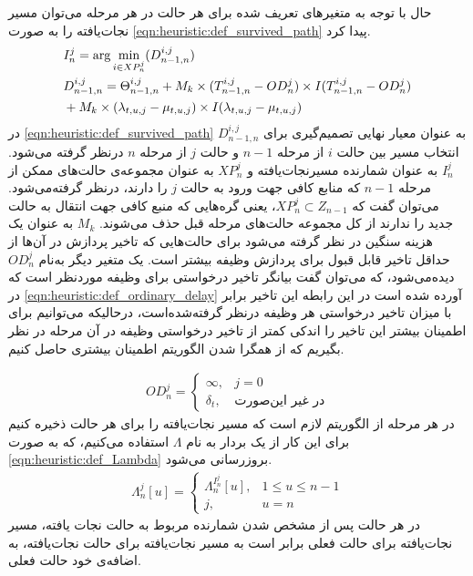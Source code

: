 	حال با توجه به متغیرهای تعریف شده برای هر حالت در هر مرحله می‌توان مسیر نجات‌یافته را به صورت \cref{eqn:heuristic:def_survived_path} پیدا کرد. 
	\begin{align}\label{eqn:heuristic:def_survived_path}
		&I_n^j = \arg \min_{i \in XP_n^j} (D_{n-1,n}^{i,j}) \\
		&D_{n-1,n}^{i,j} = \Theta_{n-1,n}^{i,j} + M_k \times (T_{n-1,n}^{i,j} - OD_n^j) \times I(T_{n-1,n}^{i,j} - OD_n^j) \notag \\
		&+M_k \times (\lambda_{t,u,j} - \mu_{t,u,j}) \times I(\lambda_{t,u,j} - \mu_{t,u,j})
	\end{align}	
در \cref{eqn:heuristic:def_survived_path} $D_{n-1,n}^{i,j}$ به عنوان معیار نهایی تصمیم‌گیری برای انتخاب مسیر بین حالت $i$ از مرحله $n-1$ و حالت $j$ از مرحله $n$ درنظر گرفته می‌شود. $I_n^j$ به عنوان شمارنده مسیرنجات‌یافته و $XP_n^j$ به عنوان مجموعه‌ی حالت‌های ممکن از مرحله $n-1$ که منابع کافی جهت ورود به حالت $j$ را دارند، درنظر گرفته‌می‌شود. می‌توان گفت که $XP_n^j \subset Z_{n-1}$، یعنی گره‌هایی که منبع کافی جهت انتقال به حالت جدید را ندارند از کل مجموعه حالت‌های مرحله قبل حذف می‌شوند. $M_k$ به عنوان یک هزینه سنگین در نظر گرفته می‌شود برای حالت‌هایی که تاخیر پردازش در آن‌ها از حداقل تاخیر قابل قبول برای پردازش وظیفه بیشتر است. یک متغیر دیگر به‌نام $OD_n^j$ دیده‌می‌شود، که می‌توان گفت بیانگر تاخیر درخواستی برای وظیفه موردنظر است که در \cref{eqn:heuristic:def_ordinary_delay} آورده شده است در این رابطه این تاخیر برابر با میزان تاخیر درخواستی هر وظیفه درنظر گرفته‌شده‌است، درحالیکه می‌توانیم برای اطمینان بیشتر این تاخیر را اندکی کمتر از تاخیر درخواستی وظیفه در آن مرحله در نظر بگیریم که از همگرا شدن الگوریتم اطمینان بیشتری حاصل کنیم. 

	\begin{align}\label{eqn:heuristic:def_ordinary_delay}
		OD_n^j = 
		\begin{cases}
			\infty, & \text{$j = 0$} \\
			\delta_t,& \text{در غیر این‌صورت}
		\end{cases}
	\end{align}
	در هر مرحله از الگوریتم لازم است که مسیر نجات‌یافته را برای هر حالت ذخیره کنیم برای این کار از یک بردار به نام $\Lambda$ استفاده می‌کنیم، که به صورت \cref{eqn:heuristic:def_Lambda} بروزرسانی می‌شود. 
	\begin{align}\label{eqn:heuristic:def_Lambda}
		\Lambda_n^j[u] = 
		\begin{cases}
			\Lambda_n^{I_n^j}[u], & 1 \le u \le n-1 \\
			j, 				& u = n
		\end{cases}
	\end{align}
	در هر حالت پس از مشخص شدن شمارنده مربوط به حالت نجات یافته، مسیر نجات‌یافته برای حالت فعلی برابر است به مسیر نجات‌یافته برای حالت نجات‌یافته، به اضافه‌ی خود حالت فعلی. 

